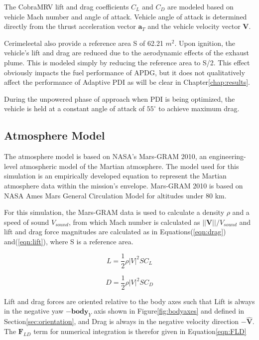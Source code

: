 The CobraMRV lift and drag coefficients $C_L$ and $C_D$ are modeled based on vehicle Mach number and angle of attack. Vehicle angle of attack is determined directly from the thrust acceleration vector $\bm{a}_T$ and the vehicle velocity vector $\bm{V}$.

Cerimele\:et\:al also provide a reference area S of 62.21 $m^2$. Upon ignition, the vehicle's lift and drag are reduced due to the aerodynamic effects of the exhaust plume. This is modeled simply by reducing the reference area to S/2. This effect obviously impacts the fuel performance of APDG, but it does not qualitatively affect the performance of Adaptive PDI as will be clear in Chapter\:\ref{chap:results}.

During the unpowered phase of approach when PDI is being optimized, the vehicle is held at a constant angle of attack of $55^{\circ}$ to achieve maximum drag. 

\subsection{Atmosphere Model}\label{sec:atmosphere}
The atmosphere model is based on NASA's Mars-GRAM 2010\:\cite{MARSGRAM}, an engineering-level atmospheric model of the Martian atmosphere. The model used for this simulation is an empirically developed equation to represent the Martian atmosphere data within the mission's envelope. Mars-GRAM 2010 is based on NASA Ames Mars General Circulation Model for altitudes under 80 km.

For this simulation, the Mars-GRAM data is used to calculate a density $\rho$ and a speed of sound $V_{sound}$, from which Mach number is calculated as $||\bm{V}||/V_{sound}$ and lift and drag force magnitudes are calculated as in Equations\:(\ref{eqn:drag}) and\:(\ref{eqn:lift}), where S is a reference area.


\begin{equation}
\label{eqn:lift}
L = \frac{1}{2} \rho |V|^2 S C_L
\end{equation}

\begin{equation}
\label{eqn:drag}
D = \frac{1}{2} \rho |V|^2 S C_D
\end{equation}

Lift and drag forces are oriented relative to the body axes such that Lift is always in the negative yaw $-\bm{body}_Y$ axis shown in Figure\:\ref{fig:bodyaxes} and defined in Section\:\ref{sec:orientation}, and Drag is always in the negative velocity direction $-\bm{\hat{V}}$. The $\bm{F}_{LD}$ term for numerical integration is therefor given in Equation\:\ref{eqn:FLD}

